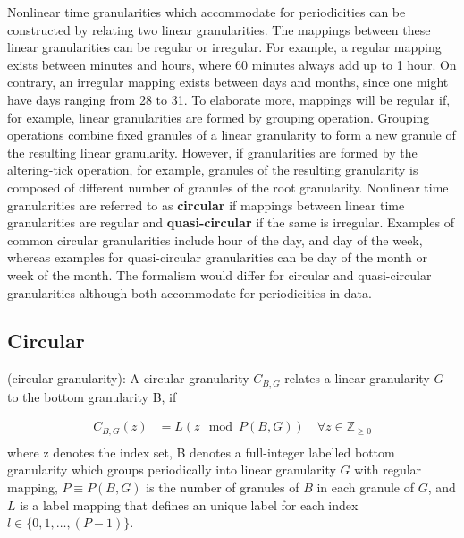 \documentclass[12pt]{article}
\begin{document}
Nonlinear time granularities which accommodate for periodicities can be constructed by relating two linear granularities. The mappings between these linear granularities can be regular or irregular. For example, a regular mapping exists between minutes and hours, where 60 minutes always add up to 1 hour. On contrary, an irregular mapping exists between days and months, since one might have days ranging from 28 to 31. To elaborate more, mappings will be regular if, for example, linear granularities are formed by grouping operation. Grouping operations combine fixed granules of a linear granularity to form a new granule of the resulting linear granularity. However, if granularities are formed by the altering-tick operation, for example, granules of the resulting granularity is composed of different number of granules of the root granularity. Nonlinear time granularities are referred to as \textbf{circular} if mappings between linear time granularities are regular and \textbf{quasi-circular} if the same is irregular. Examples of common circular granularities include hour of the day, and day of the week, whereas examples for quasi-circular granularities can be day of the month or week of the month. The formalism would differ for circular and quasi-circular granularities although both accommodate for periodicities in data.

\hypertarget{sec:circular-gran-def}{%
\subsection{Circular}\label{sec:circular-gran-def}}

\begin{definition}\label{def:circular}
(circular granularity): A circular granularity $C_{B, G}$ relates a linear granularity $G$ to the bottom granularity B, if

\begin{equation} \label{eq:circular-gran}
\begin{split}
C_{B, G}(z) & = {L}(z\mod P(B, G)) \quad \forall z \in \mathbb{Z}_{\geq 0} \\
\end{split}
\end{equation}
where
z denotes the index set,
B denotes a full-integer labelled bottom granularity which groups periodically into linear granularity $G$ with regular mapping,
$P \equiv P(B, G)$ is the number of granules of $B$ in each granule of $G$,
and ${L}$ is a label mapping that defines an unique label for each index $l \in \{ 0,1,\dots, (P-1)\}$.

\end{definition}
\end{document}
